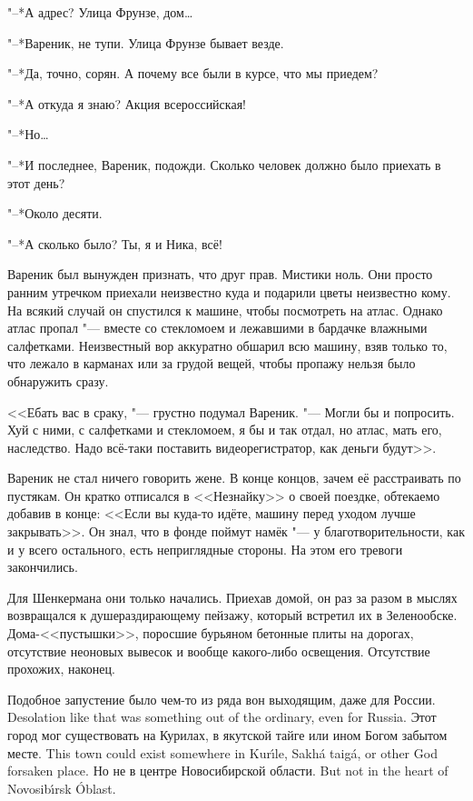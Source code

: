 "--*А адрес?
Улица Фрунзе, дом\ldots{}

"--*Вареник, не тупи.
Улица Фрунзе бывает везде.

"--*Да, точно, сорян.
А почему все были в курсе, что мы приедем?

"--*А откуда я знаю?
Акция всероссийская!

"--*Но\ldots{}

"--*И последнее, Вареник, подожди.
Сколько человек должно было приехать в этот день?

"--*Около десяти.

"--*А сколько было?
Ты, я и Ника, всё!

Вареник был вынужден признать, что друг прав.
Мистики ноль.
Они просто ранним утречком приехали неизвестно куда и подарили цветы неизвестно кому.
На всякий случай он спустился к машине, чтобы посмотреть на атлас.
Однако атлас пропал "--- вместе со стекломоем и лежавшими в бардачке влажными салфетками.
Неизвестный вор аккуратно обшарил всю машину, взяв только то, что лежало в карманах или за грудой вещей, чтобы пропажу нельзя было обнаружить сразу.

<<Ебать вас в сраку, "--- грустно подумал Вареник.
"--- Могли бы и попросить.
Хуй с ними, с салфетками и стекломоем, я бы и так отдал, но атлас, мать его, наследство.
Надо всё-таки поставить видеорегистратор, как деньги будут>>.

Вареник не стал ничего говорить жене.
В конце концов, зачем её расстраивать по пустякам.
Он кратко отписался в <<Незнайку>> о своей поездке, обтекаемо добавив в конце:
<<Если вы куда-то идёте, машину перед уходом лучше закрывать>>.
Он знал, что в фонде поймут намёк "--- у благотворительности, как и у всего остального, есть неприглядные стороны.
На этом его тревоги закончились.

Для Шенкермана они только начались.
Приехав домой, он раз за разом в мыслях возвращался к душераздирающему пейзажу, который встретил их в Зеленообске.
Дома-<<пустышки>>, поросшие бурьяном бетонные плиты на дорогах, отсутствие неоновых вывесок и вообще какого-либо освещения.
Отсутствие прохожих, наконец.

{Подобное запустение было чем-то из ряда вон выходящим, даже для России.}
{Desolation like that was something out of the ordinary, even for Russia.}
{Этот город мог существовать на Курилах, в якутской тайге или ином Богом забытом месте.}
{This town could exist somewhere in Kur\'{\i}le, Sakh\'a taig\'a, or other God forsaken place.}
{Но не в центре Новосибирской области.}
{But not in the heart of Novosib\'{\i}rsk \'Oblast.}

